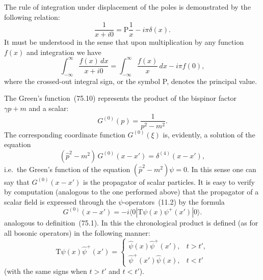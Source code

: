 The rule of integration under displacement of the poles is demonstrated by the following relation:
\begin{equation}
\frac{1}{x + i0} = \mathrm{P}\frac{1}{x} - i\pi\delta(x).
\tag{75.18}
\end{equation}
It must be understood in the sense that upon multiplication by any function $f(x)$ and integration we have
\begin{equation}
\int_{-\infty}^{\infty}\frac{f(x)\,dx}{x + i0} = \int_{-\infty}^{\infty}\frac{f(x)}{x}\,dx - i\pi f(0),
\tag{75.19}
\end{equation}
where the crossed-out integral sign, or the symbol P, denotes the principal value.

The Green's function~(75.10) represents the product of the bispinor factor $\gamma p + m$ and a scalar:
\begin{equation}
G^{(0)}(p) = \frac{1}{p^2 - m^2}.
\tag{75.20}
\end{equation}
The corresponding coordinate function $G^{(0)}(\xi)$ is, evidently, a solution of the equation
\begin{equation}
(\hat{p}^2 - m^2)\,G^{(0)}(x - x') = \delta^{(4)}(x - x'),
\tag{75.21}
\end{equation}
i.e.\ the Green's function of the equation $(\hat{p}^2 - m^2)\psi = 0$. In this sense one can say that $G^{(0)}(x - x')$ is the propagator of scalar particles. It is easy to verify by computation (analogous to the one performed above) that the propagator of a scalar field is expressed through the $\psi$-operators~(11.2) by the formula
\begin{equation}
G^{(0)}(x - x') = -i\langle 0|\mathrm{T}\psi(x)\psi^+(x')|0\rangle.
\tag{75.22}
\end{equation}
analogous to definition~(75.1). In this the chronological product is defined (as for all bosonic operators) in the following manner:
\begin{equation}
\mathrm{T}\hat{\psi}(x)\hat{\psi}^+(x') = \begin{cases}\hat{\psi}(x)\hat{\psi}^+(x'),& t > t',\\[3pt] \hat{\psi}^+(x')\hat{\psi}(x),& t < t'\end{cases}
\tag{75.23}
\end{equation}
(with the same signs when $t > t'$ and $t < t'$).
